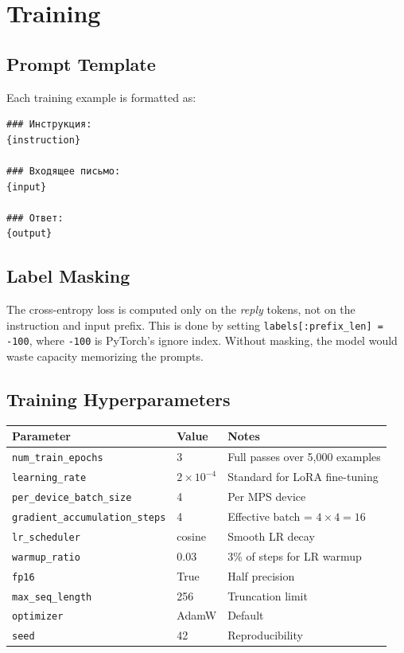 \documentclass[12pt,a4paper]{article}
\begin{document}
\section{Training}

\subsection{Prompt Template}

Each training example is formatted as:

\begin{lstlisting}
### Инструкция:
{instruction}

### Входящее письмо:
{input}

### Ответ:
{output}
\end{lstlisting}

\subsection{Label Masking}

The cross-entropy loss is computed only on the \textit{reply} tokens, not on the instruction and input prefix. This is done by setting \texttt{labels[:prefix\_len] = -100}, where \texttt{-100} is PyTorch's ignore index. Without masking, the model would waste capacity memorizing the prompts.

\subsection{Training Hyperparameters}

\begin{center}
\begin{tabular}{lll}
\toprule
Parameter & Value & Notes \\
\midrule
\texttt{num\_train\_epochs} & 3 & Full passes over 5,000 examples \\
\texttt{learning\_rate} & $2 \times 10^{-4}$ & Standard for LoRA fine-tuning \\
\texttt{per\_device\_batch\_size} & 4 & Per MPS device \\
\texttt{gradient\_accumulation\_steps} & 4 & Effective batch = $4 \times 4 = 16$ \\
\texttt{lr\_scheduler} & cosine & Smooth LR decay \\
\texttt{warmup\_ratio} & 0.03 & 3\% of steps for LR warmup \\
\texttt{fp16} & True & Half precision \\
\texttt{max\_seq\_length} & 256 & Truncation limit \\
\texttt{optimizer} & AdamW & Default \\
\texttt{seed} & 42 & Reproducibility \\
\bottomrule
\end{tabular}
\end{center}
\end{document}
